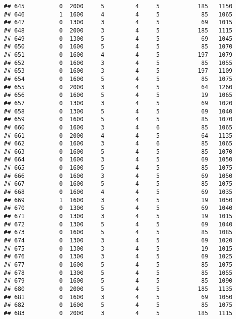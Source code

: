 \documentclass[]{article}
\begin{document}
\begin{verbatim}
## 645          0  2000     5         4     5           185   1150
## 646          1  1600     4         4     5            85   1065
## 647          0  1300     3         4     5            69   1015
## 648          0  2000     3         4     5           185   1115
## 649          0  1300     5         4     5            69   1045
## 650          0  1600     5         4     5            85   1070
## 651          0  1600     4         4     5           197   1079
## 652          0  1600     3         4     5            85   1055
## 653          0  1600     3         4     5           197   1109
## 654          0  1600     5         4     5            85   1075
## 655          0  2000     3         4     5            64   1260
## 656          0  1600     5         4     5            19   1065
## 657          0  1300     3         4     5            69   1020
## 658          0  1300     5         4     5            69   1040
## 659          0  1600     5         4     5            85   1070
## 660          0  1600     3         4     6            85   1065
## 661          0  2000     4         4     5            64   1135
## 662          0  1600     3         4     6            85   1065
## 663          0  1600     5         4     5            85   1070
## 664          0  1600     3         4     5            69   1050
## 665          0  1600     5         4     5            85   1075
## 666          0  1600     3         4     5            69   1050
## 667          0  1600     5         4     5            85   1075
## 668          0  1600     4         4     5            69   1035
## 669          1  1600     3         4     5            19   1050
## 670          0  1300     5         4     5            69   1040
## 671          0  1300     3         4     5            19   1015
## 672          0  1300     5         4     5            69   1040
## 673          0  1600     5         4     5            85   1085
## 674          0  1300     3         4     5            69   1020
## 675          0  1300     3         4     5            19   1015
## 676          0  1300     3         4     5            69   1025
## 677          0  1600     5         4     5            85   1075
## 678          0  1300     5         4     5            85   1055
## 679          0  1600     5         4     5            85   1090
## 680          0  2000     5         4     5           185   1135
## 681          0  1600     3         4     5            69   1050
## 682          0  1600     5         4     5            85   1075
## 683          0  2000     3         4     5           185   1115

\end{verbatim}
\end{document}
